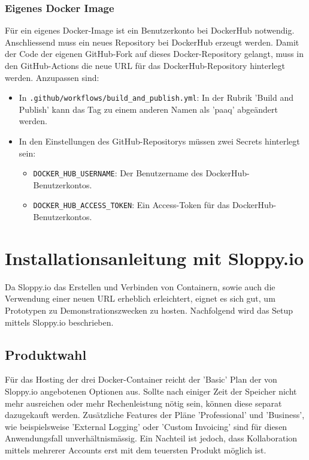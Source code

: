 \documentclass[../main.tex]{subfiles}
\begin{document}
	\subsubsection{Eigenes Docker Image}
	\par Für ein eigenes Docker-Image ist ein Benutzerkonto bei DockerHub notwendig. Anschliessend muss ein neues Repository bei DockerHub erzeugt werden. Damit der Code der eigenen GitHub-Fork auf dieses Docker-Repository gelangt, muss in den GitHub-Actions die neue URL für das DockerHub-Repository hinterlegt werden. Anzupassen sind:
	\begin{itemize}
		\item In \texttt{.github/workflows/build\_and\_publish.yml}: In der Rubrik 'Build and Publish' kann das Tag zu einem anderen Namen als 'paaq' abgeändert werden.
		\item In den Einstellungen des GitHub-Repositorys müssen zwei Secrets hinterlegt sein:
		\begin{itemize}
			\item \texttt{DOCKER\_HUB\_USERNAME}: Der Benutzername des DockerHub-Benutzerkontos.
			\item \texttt{DOCKER\_HUB\_ACCESS\_TOKEN}: Ein Access-Token für das DockerHub-Benutzerkontos.
		\end{itemize}
	\end{itemize}
	
	
	\section{Installationsanleitung mit Sloppy.io}
	Da Sloppy.io das Erstellen und Verbinden von Containern, sowie auch die Verwendung einer neuen URL erheblich erleichtert, eignet es sich gut, um Prototypen zu Demonstrationszwecken zu hosten. Nachfolgend wird das Setup mittels Sloppy.io beschrieben.
	
	\subsection{Produktwahl}
	Für das Hosting der drei Docker-Container reicht der 'Basic' Plan der von Sloppy.io angebotenen Optionen aus. Sollte nach einiger Zeit der Speicher nicht mehr ausreichen oder mehr Rechenleistung nötig sein, können diese separat dazugekauft werden. Zusätzliche Features der Pläne 'Professional' und 'Business', wie beispielsweise 'External Logging' oder 'Custom Invoicing' sind für diesen Anwendungsfall unverhältnismässig. Ein Nachteil ist jedoch, dass Kollaboration mittels mehrerer Accounts erst mit dem teuersten Produkt möglich ist.
	
\end{document}
